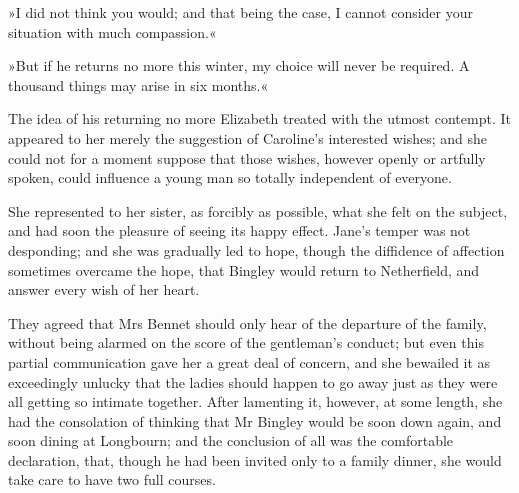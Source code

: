 »I did not think you would; and that being the case, I cannot consider your situation with much compassion.«

»But if he returns no more this winter, my choice will never be required. A thousand things may arise in six months.«

The idea of his returning no more Elizabeth treated with the utmost contempt. It appeared to her merely the suggestion of Caroline's interested wishes; and she could not for a moment suppose that those wishes, however openly or artfully spoken, could influence a young man so totally independent of everyone.

She represented to her sister, as forcibly as possible, what she felt on the subject, and had soon the pleasure of seeing its happy effect. Jane's temper was not desponding; and she was gradually led to hope, though the diffidence of affection sometimes overcame the hope, that Bingley would return to Netherfield, and answer every wish of her heart.

They agreed that Mrs Bennet should only hear of the departure of the family, without being alarmed on the score of the gentleman's conduct; but even this partial communication gave her a great deal of concern, and she bewailed it as exceedingly unlucky that the ladies should happen to go away just as they were all getting so intimate together. After lamenting it, however, at some length, she had the consolation of thinking that Mr Bingley would be soon down again, and soon dining at Longbourn; and the conclusion of all was the comfortable declaration, that, though he had been invited only to a family dinner, she would take care to have two full courses.

